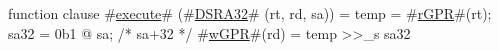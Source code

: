 function clause #\hyperref[zexecute]{execute}# (#\hyperref[zDSRAthreetwo]{DSRA32}# (rt, rd, sa)) =
  {
    temp     = #\hyperref[zrGPR]{rGPR}#(rt);
    sa32 = 0b1 @ sa; /* sa+32 */
    #\hyperref[zwGPR]{wGPR}#(rd) = temp >>_s sa32
  }
